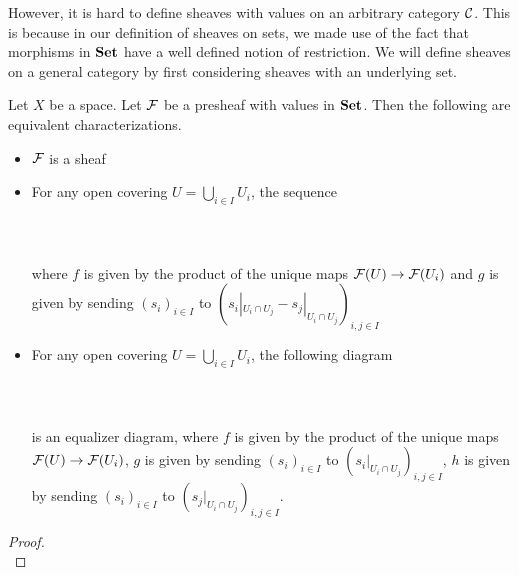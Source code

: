\documentclass[a4paper]{article}
\begin{document}
However, it is hard to define sheaves with values on an arbitrary category $\mathcal{C}$. This is because in our definition of sheaves on sets, we made use of the fact that morphisms in $\bold{Set}$ have a well defined notion of restriction. We will define sheaves on a general category by first considering sheaves with an underlying set. 

\begin{thm}{}{} Let $X$ be a space. Let $\mathcal{F}$ be a presheaf with values in $\bold{Set}$. Then the following are equivalent characterizations. 
\begin{itemize}
\item $\mathcal{F}$ is a sheaf
\item For any open covering $U=\bigcup_{i\in I}U_i$, the sequence \\~\\
\\~\\
where $f$ is given by the product of the unique maps $\mathcal{F}(U)\to\mathcal{F}(U_i)$ and $g$ is given by sending $(s_i)_{i\in I}$ to $(s_i|_{U_i\cap U_j}-s_j|_{U_i\cap U_j})_{i,j\in I}$
\item For any open covering $U=\bigcup_{i\in I}U_i$, the following diagram \\~\\
\\~\\
is an equalizer diagram, where $f$ is given by the product of the unique maps $\mathcal{F}(U)\to\mathcal{F}(U_i)$, $g$ is given by sending $(s_i)_{i\in I}$ to $(s_i|_{U_i\cap U_j})_{i,j\in I}$, $h$ is given by sending $(s_i)_{i\in I}$ to $(s_j|_{U_i\cap U_j})_{i,j\in I}$. 
\end{itemize} \tcbline
\begin{proof}~\\

\end{proof}
\end{thm}
\end{document}
